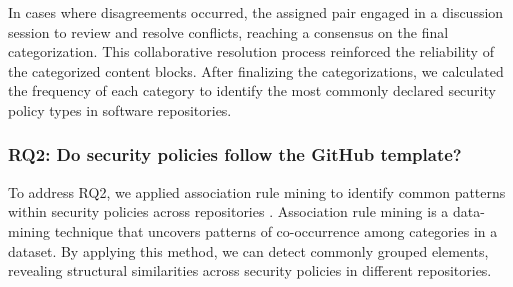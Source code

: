 In cases where disagreements occurred, the assigned pair engaged in a discussion session to review and resolve conflicts, reaching a consensus on the final categorization. This collaborative resolution process reinforced the reliability of the categorized content blocks. After finalizing the categorizations, we calculated the frequency of each category to identify the most commonly declared security policy types in software repositories. 








\subsubsection{RQ2: Do security policies follow the GitHub template?}

To address RQ2, we applied association rule mining to identify common patterns within security policies across repositories \cite{AssociationRuleMiningBook, ReadME}. Association rule mining is a data-mining technique that uncovers patterns of co-occurrence among categories in a dataset. By applying this method, we can detect commonly grouped elements, revealing structural similarities across security policies in different repositories.

